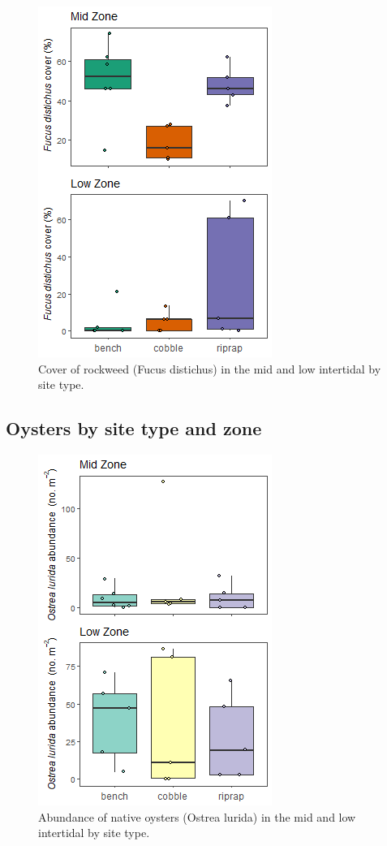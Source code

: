 \documentclass[
]{article}
\begin{document}
\begin{figure}

\includegraphics{sfb_quadrats_files/figure-latex/fucus-sitetype-zone-fig-1} \hfill{}

\caption{ Cover of rockweed (Fucus distichus) in the mid and low intertidal by site type.}\label{fig:fucus-sitetype-zone-fig}
\end{figure}

\hypertarget{oysters-by-site-type-and-zone}{%
\subsection{Oysters by site type and zone}\label{oysters-by-site-type-and-zone}}

\begin{figure}

\includegraphics{sfb_quadrats_files/figure-latex/oysters-sitetype-zone-fig-1} \hfill{}

\caption{ Abundance of native oysters (Ostrea lurida) in the mid and low intertidal by site type.}\label{fig:oysters-sitetype-zone-fig}
\end{figure}
\end{document}
